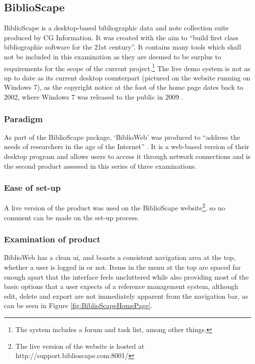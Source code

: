 \subsection{BiblioScape}
BiblioScape is a desktop-based bibliographic data and note collection suite produced by CG Information.  It was created with the aim to ``build first class bibliographic software for the 21st century''.  It contains many tools which shall not be included in this examination as they are deemed to be surplus to requirements for the scope of the current project.\footnote{The system includes a forum and task list, among other things.} The live demo system is not as up to date as its current desktop counterpart (pictured on the website running on Windows 7), as the copyright notice at the foot of the home page dates back to 2002, where Windows 7 was released to the public in 2009 \cite{Win7Release}.

\subsubsection{Paradigm}
As part of the BiblioScape package, `BiblioWeb' was produced to ``address the needs of researchers in the age of the Internet'' \cite{BiblioWebWhy}.  It is a web-based version of their desktop program and allows users to access it through network connections and is the second product assessed in this series of three examinations.

\subsubsection{Ease of set-up}
A live version of the product was used on the BiblioScape website\footnote{The live version of the website is hosted at http://support.biblioscape.com:8001/}, so no comment can be made on the set-up process.

\subsubsection{Examination of product}
BiblioWeb has a clean \gls{ui}, and boasts a consistent navigation area at the top, whether a user is logged in or not.  Items in the menu at the top are spaced far enough apart that the interface feels uncluttered while also providing most of the basic options that a user expects of a reference management system, although edit, delete and export are not immediately apparent from the navigation bar, as can be seen in Figure \ref{fig:BiblioScapeHomePage}. 

